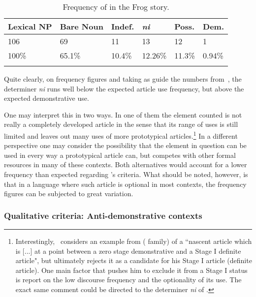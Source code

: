 \documentclass[output=paper
,modfonts
,nonflat]{langsci/langscibook}
\begin{document}
\begin{table}[h]
	\centering
	\caption{Frequency of  in the Frog story.}
	\label{tab:pico:4}
	\begin{tabularx}{.75\textwidth}{llXXXX}
		\lsptoprule
		Lexical NP & Bare Noun & Indef. & \cellcolor[HTML]{EFEFEF}\textit{ni} & Poss.  & Dem.  \\ \midrule
		106        & 69        & 11     & 13                                  & 12     & 1     \\ 
		100\%      & 65.1\%      & 10.4\%  & \cellcolor[HTML]{EFEFEF}12.26\%      & 11.3\% & 0.94\% \\ \lspbottomrule
	\end{tabularx}
\end{table}

Quite clearly, on frequency figures and taking as guide the numbers from~\citet{Cyr1993}, the determiner \textit{ni} runs well below the expected article use frequency, but above the expected demonstrative use.

One may interpret this in two ways. In one of them the element counted is not really a completely developed article in the sense that its range of uses is still limited and leaves out many uses of more prototypical articles.\footnote{Interestingly,~\citet[62]{Greenberg1978howgender} considers an example from  ( family) of a ``nascent article which is [...] at a point between a zero stage demonstrative and a Stage I definite article", but ultimately rejects it as a candidate for his Stage I article (definite article). One main factor that pushes him to exclude it from a Stage I status is  report on the low discourse frequency and the optionality of its use. The exact same comment could be directed to the determiner \textit{ni} of .} In a different perspective one may consider the possibility that the element in question can be used in every way a prototypical article can, but competes with other formal resources in many of these contexts. Both alternatives would account for a lower frequency than expected regarding \citet{Cyr1993}'s criteria. What should be noted, however, is that in a language where such article is optional in most contexts, the frequency figures can be subjected to great variation.

\subsubsection{Qualitative criteria: Anti-demonstrative contexts}\label{sec:pico:4.1.2}
\end{document}
